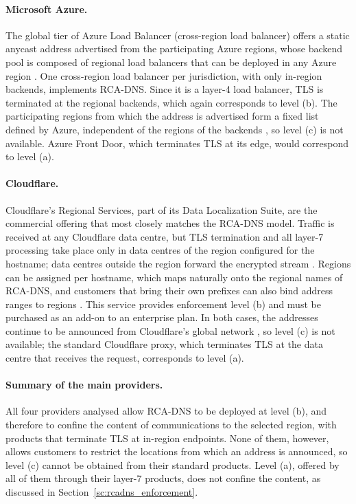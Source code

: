 \paragraph{Microsoft Azure.} The global tier of Azure Load Balancer (cross-region load balancer) offers a static anycast address advertised from the participating Azure regions, whose backend pool is composed of regional load balancers that can be deployed in any Azure region \cite{GlobalLearn}. One cross-region load balancer per jurisdiction, with only in-region backends, implements RCA-DNS. Since it is a layer-4 load balancer, TLS is terminated at the regional backends, which again corresponds to level (b). The participating regions from which the address is advertised form a fixed list defined by Azure, independent of the regions of the backends \cite{GlobalLearn}, so level (c) is not available. Azure Front Door, which terminates TLS at its edge, would correspond to level (a).

\paragraph{Cloudflare.} Cloudflare's Regional Services, part of its Data Localization Suite, are the commercial offering that most closely matches the RCA-DNS model. Traffic is received at any Cloudflare data centre, but TLS termination and all layer-7 processing take place only in data centres of the region configured for the hostname; data centres outside the region forward the encrypted stream \cite{RegionalDocs}. Regions can be assigned per hostname, which maps naturally onto the regional names of RCA-DNS, and customers that bring their own prefixes can also bind address ranges to regions \cite{RegionalizedDocs}. This service provides enforcement level (b) and must be purchased as an add-on to an enterprise plan. In both cases, the addresses continue to be announced from Cloudflare's global network \cite{ProtectDocs}, so level (c) is not available; the standard Cloudflare proxy, which terminates TLS at the data centre that receives the request, corresponds to level (a).

\paragraph{Summary of the main providers.} All four providers analysed allow RCA-DNS to be deployed at level (b), and therefore to confine the content of communications to the selected region, with products that terminate TLS at in-region endpoints. None of them, however, allows customers to restrict the locations from which an address is announced, so level (c) cannot be obtained from their standard products. Level (a), offered by all of them through their layer-7 products, does not confine the content, as discussed in Section~\ref{sc:rcadns_enforcement}.

